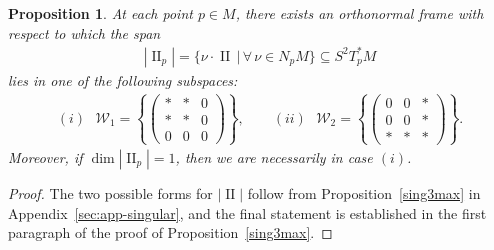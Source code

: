 \documentclass[pdftex]{sigma}
\def\II{\operatorname{II}} %
\def\W{\mathscr{W}}
\newtheorem{Proposition}[Theorem]{Proposition}
\numberwithin{equation}{section}
\begin{document}
\begin{Proposition} \label{thm1step2}
At each point $p \in M$, there exists an orthonormal frame with respect to which the span
\begin{gather*}
|\II_p| = \{ \nu \cdot \II \,|\, \forall\, \nu \in N_p M\} \subseteq S^2 T^*_p M
\end{gather*}
lies in one of the following subspaces:
\begin{gather*}
\text{$(i)$\ } \W_1 = \left\{\!\!\begin{pmatrix} * & * & 0 \\ * & * & 0 \\ 0 & 0 & 0\end{pmatrix} \!\!\right\} ,\qquad
\text{$(ii)$\ } \W_2 = \left\{\!\! \begin{pmatrix} 0 & 0 & * \\ 0 & 0 & * \\ * & * & *\end{pmatrix} \!\!\right\} .
\end{gather*}
Moreover, if $\dim |\II_p| = 1$, then we are necessarily in case $(i)$.
\end{Proposition}

\begin{proof} The two possible forms for $|\II|$ follow from Proposition~\ref{sing3max} in Appendix~\ref{sec:app-singular}, and the final statement is established in the first paragraph of the proof of Proposition~\ref{sing3max}.
\end{proof}
\end{document}
